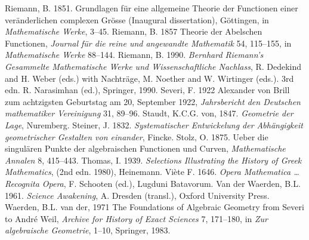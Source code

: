 \newline\indent Riemann, B. 1851.  Grundlagen f\"ur eine allgemeine Theorie der Functionen einer ver\"anderlichen complexen Gr\"osse (Inaugural dissertation), G\"ottingen, in \emph{Mathematische Werke}, 3--45.
 \newline\indent Riemann, B. 1857  Theorie der Abelschen Functionen, \emph{Journal f\"ur die reine und angewandte Mathematik}  54, 115--155, in \emph{Mathematische Werke} 88--144.
 \newline\indent  Riemann, B. 1990. \emph{Bernhard Riemann's Gesammelte Mathematische Werke und Wissenschaft\-liche Nachlass}, R. Dedekind and  H. Weber (eds.)  with Nach\-tr\"age, M. Noether and W. Wirtinger (eds.). 3rd edn. R. Narasimhan (ed.), Springer, 1990.
 \newline\indent Severi, F. 1922  Alexander von Brill zum achtzigsten Geburtstag am 20, September 1922, \emph{Jahrsbericht den Deutschen mathematiker Vereinigung} 31, 89--96.
  \newline\indent Staudt, K.C.G. von, 1847. \emph{Geometrie der Lage}, Nuremberg.
\newline\indent   Steiner, J. 1832. \emph{Systematischer Entwickelung der Abh\"angigkeit geometri\-scher Gestalten von einander}, Fincke.
 \newline\indent Stolz, O.  1875. Ueber die singul\"aren Punkte der algebraischen Functionen und Curven, \emph{Mathematische Annalen} 8, 415--443. 
\newline\indent Thomas, I. 1939. \emph{Selections Illustrating the History of Greek Mathematics}, (2nd edn. 1980), Heinemann.
 \newline\indent Vi\`ete  F. 1646.  \emph{Opera Mathematica \ldots Recognita Opera}, F.  Schooten (ed.), Lugduni Batavorum.
\newline\indent Van der Waerden, B.L. 1961. \emph{Science Awakening}, A. Dresden (transl.), Oxford University Press.
\newline\indent Waerden, B.L. van der, 1971  The Foundations of Algebraic Geometry from Severi to Andr{\'e} Weil, \emph{Archive for History of Exact Sciences} 7,  171--180, in  \emph{Zur algebraische Geometrie},  1--10, Springer, 1983.
 \normalsize
 
 
 
 
 
 








